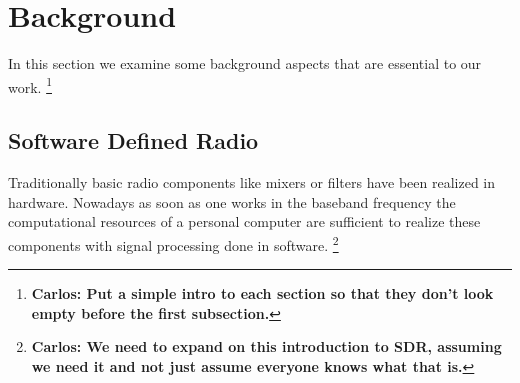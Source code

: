 \documentclass[conference]{IEEEtran}
\newcommand{\cp}[1]{\footnote{{\bf Carlos: #1}}}
\begin{document}
%



\section{Background}

In this section we examine some background aspects that are essential to our
work. \cp{Put a simple intro to each section so that they don't look empty
before the first subsection.}

\subsection{Software Defined Radio}
Traditionally basic radio components like mixers or filters have been realized
in hardware. Nowadays as soon as one works in the baseband frequency the
computational resources of a personal computer are sufficient to realize these
components with signal processing done in software. \cp{We need to expand on
this introduction to SDR, assuming we need it and not just assume everyone
knows what that is.}
\end{document}
